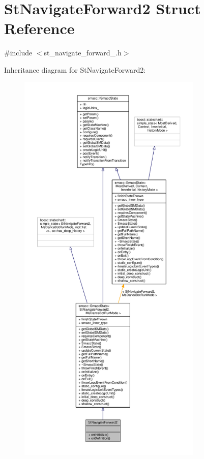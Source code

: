 \hypertarget{structStNavigateForward2}{}\section{St\+Navigate\+Forward2 Struct Reference}
\label{structStNavigateForward2}


{\ttfamily \#include $<$st\+\_\+navigate\+\_\+forward\+\_.\+h$>$}



Inheritance diagram for St\+Navigate\+Forward2\+:
\nopagebreak
\begin{figure}[H]
\begin{center}
\leavevmode
\includegraphics[height=550pt]{structStNavigateForward2__inherit__graph}
\end{center}
\end{figure}


